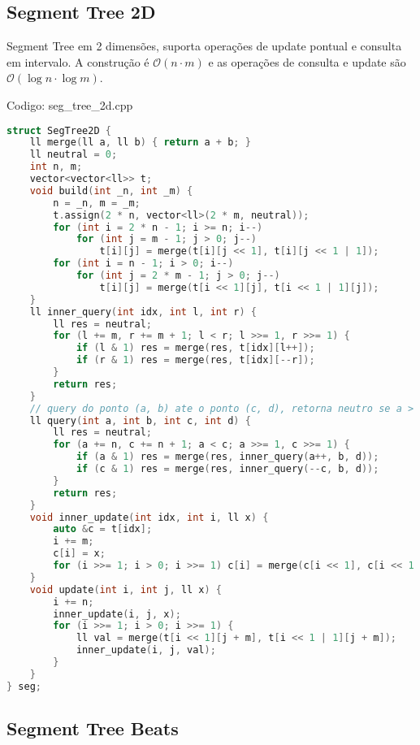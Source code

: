 \documentclass[10pt, a4paper, oneside]{book}
\begin{document}
\subsection{Segment Tree 2D}


Segment Tree em 2 dimensões, suporta operações de update pontual e consulta em intervalo. A construção é $\mathcal{O}(n \cdot m)$ e as operações de consulta e update são $\mathcal{O}(\log n \cdot \log m)$.
\hfill

Codigo: seg\_tree\_2d.cpp

\begin{lstlisting}[language=C++]
struct SegTree2D {
    ll merge(ll a, ll b) { return a + b; }
    ll neutral = 0;
    int n, m;
    vector<vector<ll>> t;
    void build(int _n, int _m) {
        n = _n, m = _m;
        t.assign(2 * n, vector<ll>(2 * m, neutral));
        for (int i = 2 * n - 1; i >= n; i--)
            for (int j = m - 1; j > 0; j--)
                t[i][j] = merge(t[i][j << 1], t[i][j << 1 | 1]);
        for (int i = n - 1; i > 0; i--)
            for (int j = 2 * m - 1; j > 0; j--)
                t[i][j] = merge(t[i << 1][j], t[i << 1 | 1][j]);
    }
    ll inner_query(int idx, int l, int r) {
        ll res = neutral;
        for (l += m, r += m + 1; l < r; l >>= 1, r >>= 1) {
            if (l & 1) res = merge(res, t[idx][l++]);
            if (r & 1) res = merge(res, t[idx][--r]);
        }
        return res;
    }
    // query do ponto (a, b) ate o ponto (c, d), retorna neutro se a > c ou b > d
    ll query(int a, int b, int c, int d) {
        ll res = neutral;
        for (a += n, c += n + 1; a < c; a >>= 1, c >>= 1) {
            if (a & 1) res = merge(res, inner_query(a++, b, d));
            if (c & 1) res = merge(res, inner_query(--c, b, d));
        }
        return res;
    }
    void inner_update(int idx, int i, ll x) {
        auto &c = t[idx];
        i += m;
        c[i] = x;
        for (i >>= 1; i > 0; i >>= 1) c[i] = merge(c[i << 1], c[i << 1 | 1]);
    }
    void update(int i, int j, ll x) {
        i += n;
        inner_update(i, j, x);
        for (i >>= 1; i > 0; i >>= 1) {
            ll val = merge(t[i << 1][j + m], t[i << 1 | 1][j + m]);
            inner_update(i, j, val);
        }
    }
} seg;
\end{lstlisting}
\hfill

\subsection{Segment Tree Beats}
\end{document}
